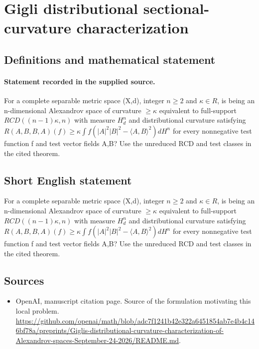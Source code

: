 \documentclass[11pt]{article}
\begin{document}
\section*{Gigli distributional sectional-curvature characterization}\label{30007142}
\subsection{Definitions and mathematical statement}
\paragraph{Statement recorded in the supplied source.}
For a complete separable metric space (X,d), integer $n\geq 2$ and $\kappa \in R$, is being an n-dimensional Alexandrov space of curvature $\geq \kappa $ equivalent to full-support $RCD((n-1)\kappa ,n)$ with measure $H^{n}_d$ and distributional curvature satisfying $R(A,B,B,A)(f)\geq \kappa \int f(|A|^{2}|B|^{2}-\langle A,B\rangle ^{2})dH^{n}$ for every nonnegative test function f and test vector fields A,B? Use the unreduced RCD and test classes in the cited theorem.
\subsection{Short English statement}
For a complete separable metric space (X,d), integer $n\geq 2$ and $\kappa \in R$, is being an n-dimensional Alexandrov space of curvature $\geq \kappa $ equivalent to full-support $RCD((n-1)\kappa ,n)$ with measure $H^{n}_d$ and distributional curvature satisfying $R(A,B,B,A)(f)\geq \kappa \int f(|A|^{2}|B|^{2}-\langle A,B\rangle ^{2})dH^{n}$ for every nonnegative test function f and test vector fields A,B? Use the unreduced RCD and test classes in the cited theorem.
\subsection{Sources}
\begin{itemize}
\item[S1] OpenAI, manuscript citation page. Source of the formulation motivating this local problem.
\url{https://github.com/openai/math/blob/adc7f1241b42e322a6451854ab7e4b4c146bf78a/preprints/Giglis-distributional-curvature-characterization-of-Alexandrov-spaces-September-24-2026/README.md}.
\end{itemize}
\end{document}
